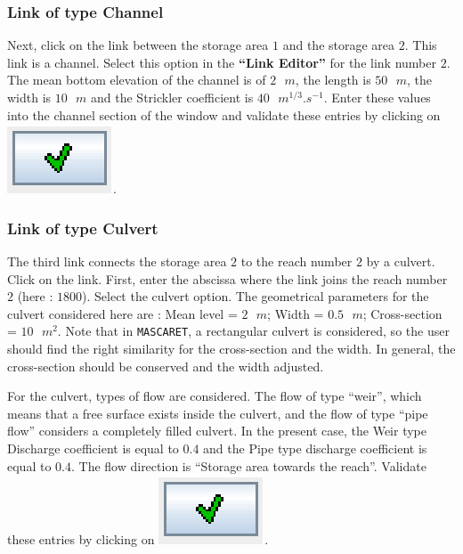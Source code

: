 \documentclass[a4paper,12pt]{article}
\begin{document}
\subsubsection{Link of type Channel }

\hspace{0.5cm}Next, click on the link between the storage area $1$ and the storage
area $2$. This link is a channel. Select this option in the \textbf{{}``Link
Editor''} for the link number $2$. The mean bottom elevation of the
channel is of $2\mbox{ }m$, the length is $50\mbox{ }m$, the width is $10\mbox{ }m$ and the Strickler
coefficient is $40\mbox{ }m^{1/3}.s^{-1}$. Enter these values into the channel section of
the window and validate these entries by clicking on \includegraphics[scale=0.6]{valid}.


\subsubsection{Link of type Culvert }

\hspace{0.5cm}The third link connects the storage area $2$ to the reach number $2$ by
a culvert. Click on the link. First, enter the abscissa where the
link joins the reach number $2$ (here : $1800$). Select the culvert option.
The geometrical parameters for the culvert considered here are : Mean
level = $2\mbox{ }m$; Width = $0.5\mbox{ }m$; Cross-section = $10\mbox{ }m^2$.
Note that in \texttt{MASCARET}, a rectangular culvert is considered, so the
user should find the right similarity for the cross-section and the
width. In general, the cross-section should be conserved and the width
adjusted.

\vspace{0.5cm}

For the culvert, types of flow are considered. The flow of type {}``weir'',
which means that a free surface exists inside the culvert, and the
flow of type {}``pipe flow'' considers a completely filled culvert.
In the present case, the Weir type Discharge coefficient is equal
to $0.4$ and the Pipe type discharge coefficient is equal to $0.4$. The
flow direction is {}``Storage area towards the reach''. Validate
these entries by clicking on \includegraphics[scale=0.6]{valid}.
\end{document}
